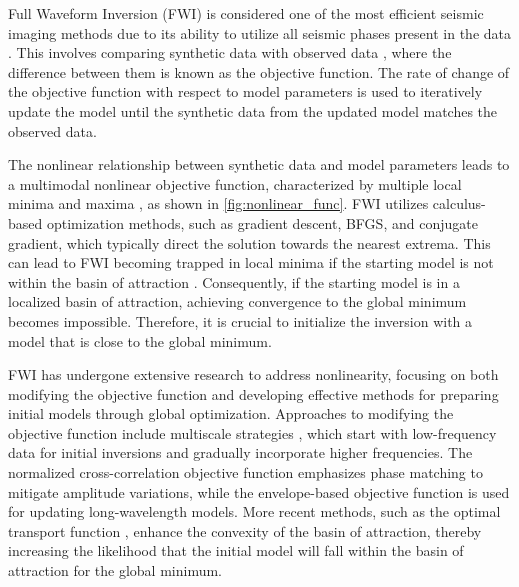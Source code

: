 \documentclass[paper,revised]{geophysics}
\begin{document}
Full Waveform Inversion (FWI) is considered one of the most efficient seismic imaging methods due to its ability to utilize all seismic phases present in the data \citep{Pratt1999, Schuster2017, Tarantola1986, Virieux2009a}. This involves comparing synthetic data with observed data \citep{Gomez2017, Liu2017, Metivier2018}, where the difference between them is known as the objective function. The rate of change of the objective function with respect to model parameters \citep{Plessix2006} is used to iteratively update the model until the synthetic data from the updated model matches the observed data.
\par
The nonlinear relationship between synthetic data and model parameters \citep{Crase1990, Geng2018, Guo2021} leads to a multimodal nonlinear objective function, characterized by multiple local minima and maxima \citep{TenKroode2013}, as shown in \ref{fig:nonlinear_func}. FWI utilizes calculus-based optimization methods, such as gradient descent, BFGS, and conjugate gradient, which typically direct the solution towards the nearest extrema. This can lead to FWI becoming trapped in local minima if the starting model is not within the basin of attraction \citep{FitchnerETH2015}. Consequently, if the starting model is in a localized basin of attraction, achieving convergence to the global minimum becomes impossible. Therefore, it is crucial to initialize the inversion with a model that is close to the global minimum.
\par
FWI has undergone extensive research to address nonlinearity, focusing on both modifying the objective function and developing effective methods for preparing initial models through global optimization. Approaches to modifying the objective function include multiscale strategies \citep{Bunks1995a, Ravaut2004, Schafer2014, Sirgue2004}, which start with low-frequency data for initial inversions and gradually incorporate higher frequencies. The normalized cross-correlation objective function \citep{Chi2015, Liu2017} emphasizes phase matching to mitigate amplitude variations, while the envelope-based objective function \citep{Borisov2018, Chi2014} is used for updating long-wavelength models. More recent methods, such as the optimal transport function \citep{Brossier2016, Metivier2016, Metivier2018}, enhance the convexity of the basin of attraction, thereby increasing the likelihood that the initial model will fall within the basin of attraction for the global minimum.
\end{document}
